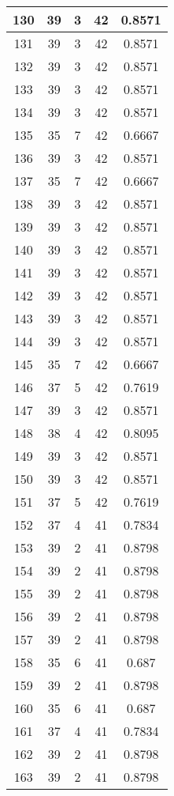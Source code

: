 \documentclass[letterpaper, 12pt]{article}
\begin{document}
\begin{longtable}{|c|c|c|c|c|}
\hline
130 & 39 & 3 & 42 & 0.8571 \\
\hline
131 & 39 & 3 & 42 & 0.8571 \\
\hline
132 & 39 & 3 & 42 & 0.8571 \\
\hline
133 & 39 & 3 & 42 & 0.8571 \\
\hline
134 & 39 & 3 & 42 & 0.8571 \\
\hline
135 & 35 & 7 & 42 & 0.6667 \\
\hline
136 & 39 & 3 & 42 & 0.8571 \\
\hline
137 & 35 & 7 & 42 & 0.6667 \\
\hline
138 & 39 & 3 & 42 & 0.8571 \\
\hline
139 & 39 & 3 & 42 & 0.8571 \\
\hline
140 & 39 & 3 & 42 & 0.8571 \\
\hline
141 & 39 & 3 & 42 & 0.8571 \\
\hline
142 & 39 & 3 & 42 & 0.8571 \\
\hline
143 & 39 & 3 & 42 & 0.8571 \\
\hline
144 & 39 & 3 & 42 & 0.8571 \\
\hline
145 & 35 & 7 & 42 & 0.6667 \\
\hline
146 & 37 & 5 & 42 & 0.7619 \\
\hline
147 & 39 & 3 & 42 & 0.8571 \\
\hline
148 & 38 & 4 & 42 & 0.8095 \\
\hline
149 & 39 & 3 & 42 & 0.8571 \\
\hline
150 & 39 & 3 & 42 & 0.8571 \\
\hline
151 & 37 & 5 & 42 & 0.7619 \\
\hline
152 & 37 & 4 & 41 & 0.7834 \\
\hline
153 & 39 & 2 & 41 & 0.8798 \\
\hline
154 & 39 & 2 & 41 & 0.8798 \\
\hline
155 & 39 & 2 & 41 & 0.8798 \\
\hline
156 & 39 & 2 & 41 & 0.8798 \\
\hline
157 & 39 & 2 & 41 & 0.8798 \\
\hline
158 & 35 & 6 & 41 & 0.687 \\
\hline
159 & 39 & 2 & 41 & 0.8798 \\
\hline
160 & 35 & 6 & 41 & 0.687 \\
\hline
161 & 37 & 4 & 41 & 0.7834 \\
\hline
162 & 39 & 2 & 41 & 0.8798 \\
\hline
163 & 39 & 2 & 41 & 0.8798 \\

\end{longtable}
\end{document}
